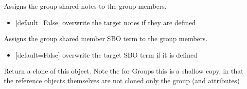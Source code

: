 \documentclass[letterpaper,10pt,english]{sphinxmanual}
\begin{document}
\begin{fulllineitems}
\begin{fulllineitems}
\end{fulllineitems}


\begin{fulllineitems}
\label{\detokenize{modules_doc:cbmpy.CBModel.Group.assignSharedNotesToMembers}}
\pysigstartsignatures
{}
\pysigstopsignatures
\sphinxAtStartPar
Assigns the group shared notes to the group members.
\begin{itemize}
\item {} 
\sphinxAtStartPar
{} {[}default=False{]} overwrite the target notes if they are defined

\end{itemize}

\end{fulllineitems}


\begin{fulllineitems}
\label{\detokenize{modules_doc:cbmpy.CBModel.Group.assignSharedSBOtermsToMembers}}
\pysigstartsignatures
{}
\pysigstopsignatures
\sphinxAtStartPar
Assigns the group shared member SBO term to the group members.
\begin{itemize}
\item {} 
\sphinxAtStartPar
{} {[}default=False{]} overwrite the target SBO term if it is defined

\end{itemize}

\end{fulllineitems}


\begin{fulllineitems}
\label{\detokenize{modules_doc:cbmpy.CBModel.Group.clone}}
\pysigstartsignatures
{}
\pysigstopsignatures
\sphinxAtStartPar
Return a clone of this object. Note the for Groups this is a shallow copy, in that the reference
objects themselves are not cloned only the group (and attributes)


\end{fulllineitems}
\end{fulllineitems}
\end{document}

